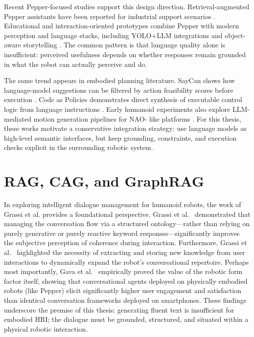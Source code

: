   Recent Pepper-focused studies support this design direction. Retrieval-augmented Pepper assistants have been reported for industrial support scenarios \cite{brad_retrieval-augmented_2025}. Educational
  and interaction-oriented prototypes combine Pepper with modern perception and language stacks, including YOLO+LLM integrations and object-aware storytelling
  \cite{latif_physicsassistant_2024,zabala_exploring_2025,wang_target_2024,becerra_improving_2024}. The common pattern is that language quality alone is insufficient: perceived usefulness depends on
  whether responses remain grounded in what the robot can actually perceive and do.

  The same trend appears in embodied planning literature. SayCan shows how language-model suggestions can be filtered by action feasibility scores before execution \cite{ahn_as_2022}. Code as Policies
  demonstrates direct synthesis of executable control logic from language instructions \cite{liang_code_2023}. Early humanoid experiments also explore LLM-mediated motion generation pipelines for NAO-
  like platforms \cite{catalini_llms_nodate}. For this thesis, these works motivate a conservative integration strategy: use language models as high-level semantic interfaces, but keep grounding,
  constraints, and execution checks explicit in the surrounding robotic system.




\section{RAG, CAG, and GraphRAG}


In exploring intelligent dialogue management for humanoid robots, the work of Grassi et al. provides a foundational perspective. Grassi et al.~\cite{grassi2022knowledge} demonstrated that managing the conversation flow via a structured ontology---rather than relying on purely generative or purely reactive keyword responses---significantly improves the subjective perception of coherence during interaction. Furthermore, Grassi et al.~\cite{grassi2023knowledge} highlighted the necessity of extracting and storing new knowledge from user interactions to dynamically expand the robot's conversational repertoire. Perhaps most importantly, Gava et al.~\cite{gava2024physical} empirically proved the value of the robotic form factor itself, showing that conversational agents deployed on physically embodied robots (like Pepper) elicit significantly higher user engagement and satisfaction than identical conversation frameworks deployed on smartphones. These findings underscore the premise of this thesis: generating fluent text is insufficient for embodied HRI; the dialogue must be grounded, structured, and situated within a physical robotic interaction.

